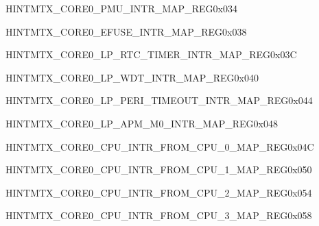\begin{register}{H}{INTMTX\_CORE0\_PMU\_INTR\_MAP\_REG}{0x034}\label{regdesc:INTMTXCORE0PMUINTRMAPREG} \end{register}\vspace{-3em}
\begin{register}{H}{INTMTX\_CORE0\_EFUSE\_INTR\_MAP\_REG}{0x038}\label{regdesc:INTMTXCORE0EFUSEINTRMAPREG} \end{register}\vspace{-3em}
\begin{register}{H}{INTMTX\_CORE0\_LP\_RTC\_TIMER\_INTR\_MAP\_REG}{0x03C}\label{regdesc:INTMTXCORE0LPRTCTIMERINTRMAPREG} \end{register}\vspace{-3em}
\begin{register}{H}{INTMTX\_CORE0\_LP\_WDT\_INTR\_MAP\_REG}{0x040}\label{regdesc:INTMTXCORE0LPWDTINTRMAPREG} \end{register}\vspace{-3em}
\begin{register}{H}{INTMTX\_CORE0\_LP\_PERI\_TIMEOUT\_INTR\_MAP\_REG}{0x044}\label{regdesc:INTMTXCORE0LPPERITIMEOUTINTRMAPREG} \end{register}\vspace{-3em}
\begin{register}{H}{INTMTX\_CORE0\_LP\_APM\_M0\_INTR\_MAP\_REG}{0x048}\label{regdesc:INTMTXCORE0LPAPMM0INTRMAPREG} \end{register}\vspace{-3em}
\begin{register}{H}{INTMTX\_CORE0\_CPU\_INTR\_FROM\_CPU\_0\_MAP\_REG}{0x04C}\label{regdesc:INTMTXCORE0CPUINTRFROMCPU0MAPREG} \end{register}\vspace{-3em}
\begin{register}{H}{INTMTX\_CORE0\_CPU\_INTR\_FROM\_CPU\_1\_MAP\_REG}{0x050}\label{regdesc:INTMTXCORE0CPUINTRFROMCPU1MAPREG} \end{register}\vspace{-3em}
\begin{register}{H}{INTMTX\_CORE0\_CPU\_INTR\_FROM\_CPU\_2\_MAP\_REG}{0x054}\label{regdesc:INTMTXCORE0CPUINTRFROMCPU2MAPREG} \end{register}\vspace{-3em}
\begin{register}{H}{INTMTX\_CORE0\_CPU\_INTR\_FROM\_CPU\_3\_MAP\_REG}{0x058}\label{regdesc:INTMTXCORE0CPUINTRFROMCPU3MAPREG} \end{register}\vspace{-3em}
